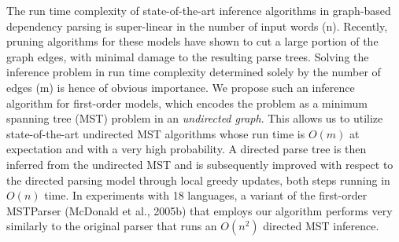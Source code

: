 The run time complexity of state-of-the-art inference algorithms in graph-based dependency parsing is super-linear in the number of input words (n). Recently, pruning algorithms for these models have shown to cut a large portion of the graph edges, with minimal damage to the resulting parse trees. Solving the inference problem in run time complexity determined solely by the number of edges (m) is hence of obvious importance. We propose such an inference algorithm for first-order models, which encodes the problem as a minimum spanning tree (MST) problem in an \textit{undirected graph}. This allows us to utilize state-of-the-art undirected MST algorithms whose run time is $O(m)$ at expectation and with a very high probability. A directed parse tree is then inferred from the undirected MST and is subsequently improved with respect to the directed parsing model through local greedy updates, both steps running in $O(n)$ time. In experiments with 18 languages, a variant of the first-order MSTParser (McDonald et al., 2005b) that employs our algorithm performs very similarly to the original parser that runs an $O(n^2)$ directed MST inference.
